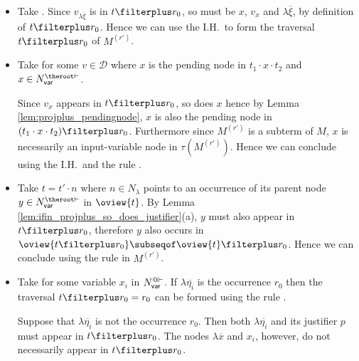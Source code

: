\begin{itemize}
    \item {} Take . Since $v_{\lambda \overline{\xi}}$ is in $t \filterplus r_0$, so must be $x$, $v_x$ and $\lambda \overline{\xi}$, by definition of $t \filterplus r_0$. Hence we can use the I.H.\ to form the traversal $t \filterplus r_0$ of $M^{(r')}$.

   \item {} Take  for some
    $v \in \mathcal{D}$ where $x$ is the pending node in $t_1 \cdot x \cdot t_2$ and $x \in N_{\sf var}^{\theroot\vdash}$.

    Since $v_x$ appears in $t\filterplus r_0$, so does $x$ hence
    by Lemma \ref{lem:projplus_pendingnode}, $x$ is also the
    pending node in $(t_1 \cdot x \cdot t_2)\filterplus r_0$.
    Furthermore since $M^{(r')}$ is a subterm of $M$, $x$ is
    necessarily an input-variable node in $\tau(M^{(r')})$.
    Hence we can conclude using the I.H.\ and the rule
    .

    \item {}  Take $t =  t' \cdot n$ where $n \in N_\lambda$ points to an occurrence of its parent node $y \in N_{\sf var}^{\theroot\vdash}$ in $\oview{t}$.
    By Lemma \ref{lem:ifin_projplus_so_does_justifier}(a), $y$
    must also appear in $t\filterplus r_0$, therefore $y$ also
    occurs in $\oview{t\filterplus r_0} \subseqof
    \oview{t}\filterplus r_0$. Hence we can conclude using the
    rule  in $M^{(r')}$.


    \item {}
    Take  for some
        variable $x_i$ in $N_{\sf var}^{@\vdash}$.
    If $\lambda \overline{\eta_i}$ is the occurrence $r_0$ then
    the traversal $t\filterplus r_0 = r_0$ can be formed using
    the rule .

    Suppose that $\lambda \overline{\eta_i}$ is not the occurrence $r_0$. Then both $\lambda \overline{\eta_i}$ and its justifier $p$ must appear in $t\filterplus r_0$. The nodes $\lambda
    \overline{x}$ and $x_i$, however, do not necessarily appear in    $t\filterplus r_0$.


\end{itemize}
